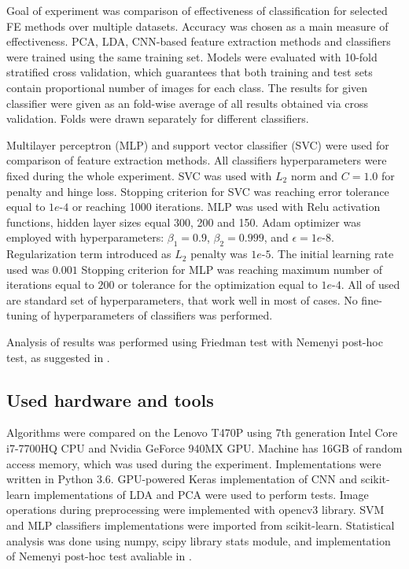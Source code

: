 \documentclass[a4paper, 10 pt, journal]{ieeeconf}
\begin{document}
Goal of experiment was comparison of effectiveness of classification for selected FE methods over multiple datasets. Accuracy was chosen as a main measure of effectiveness. PCA, LDA, CNN-based feature extraction methods and classifiers were trained using the same training set. Models were evaluated with 10-fold stratified cross validation, which guarantees that both training and test sets contain proportional number of images for each class. The results for given classifier were given as an fold-wise average of all results obtained via cross validation. Folds were drawn separately for different classifiers. 

Multilayer perceptron (MLP) and support vector classifier (SVC) were used for comparison of feature extraction methods. All classifiers hyperparameters were fixed during the whole experiment. SVC was used with $L_{2}$ norm and $C=1.0$ for penalty and hinge loss. Stopping criterion for SVC was reaching error tolerance equal to $1e\mbox{-}4$ or reaching 1000 iterations. MLP was used with Relu activation functions, hidden layer sizes equal 300, 200 and 150. Adam optimizer was employed with hyperparameters: $\beta_1 = 0.9$, $\beta_2 = 0.999$, and $\epsilon=1e \mbox{-} 8$. Regularization term introduced as $L_2$ penalty was $1e\mbox{-}5$. The initial learning rate used was $0.001$ Stopping criterion for MLP was reaching maximum number of iterations equal to $200$ or tolerance for the optimization equal to $1e\mbox{-}4$.
All of used are standard set of hyperparameters, that work well in most of cases. No fine-tuning of hyperparameters of classifiers was performed.

Analysis of results was performed using Friedman test with Nemenyi post-hoc test, as suggested in \cite{demsar}.

\subsection{Used hardware and tools}

Algorithms were compared on the Lenovo T470P using 7th generation Intel Core i7-7700HQ CPU and Nvidia GeForce 940MX GPU. Machine has 16GB of random access memory, which was used during the experiment. Implementations were written in Python 3.6. GPU-powered Keras implementation of CNN and scikit-learn implementations of LDA and PCA were used to perform tests. Image operations during preprocessing were implemented with opencv3 library. SVM and MLP classifiers implementations were imported from scikit-learn. Statistical analysis was done using numpy, scipy library stats module, and implementation of Nemenyi post-hoc test avaliable in \cite{post_hoc_nemenyi}.
\end{document}
